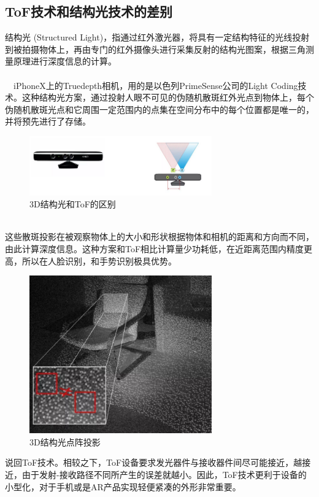 \documentclass[UTF8]{ctexart}
\begin{document}
\subsection{ToF技术和结构光技术的差别}
结构光 (Structured Light)，指通过红外激光器，将具有一定结构特征的光线投射到被拍摄物体上，再由专门的红外摄像头进行采集反射的结构光图案，根据三角测量原理进行深度信息的计算。
\\
\\　iPhoneX上的Truedepth相机，用的是以色列PrimeSense公司的Light Coding技术。这种结构光方案，通过投射人眼不可见的伪随机散斑红外光点到物体上，每个伪随机散斑光点和它周围一定范围内的点集在空间分布中的每个位置都是唯一的，并将预先进行了存储。
\begin{figure}
	\centering
	\includegraphics[width=0.7\textwidth]{ToFAND3D.png}
	\caption{3D结构光和ToF的区别}
	\label{Fig.main1}
\end{figure}
\\
这些散斑投影在被观察物体上的大小和形状根据物体和相机的距离和方向而不同，由此计算深度信息。这种方案和ToF相比计算量少功耗低，在近距离范围内精度更高，所以在人脸识别，和手势识别极具优势。
\begin{figure}
	\centering
	\includegraphics[width=0.7\textwidth]{3Dsensor.jpg}
	\caption{3D结构光点阵投影}
	\label{Fig.main1}
\end{figure}
说回ToF技术。相较之下，ToF设备要求发光器件与接收器件间尽可能接近，越接近，由于发射-接收路径不同所产生的误差就越小。因此，ToF技术更利于设备的小型化，对于手机或是AR产品实现轻便紧凑的外形非常重要。\\ 
\end{document}
